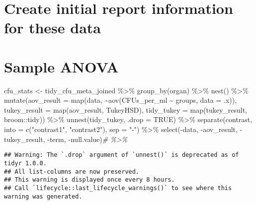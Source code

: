 \documentclass[
]{book}
\newenvironment{Shaded}{\begin{snugshade}}{\end{snugshade}}
\newcommand{\AttributeTok}[1]{\textcolor[rgb]{0.77,0.63,0.00}{#1}}
\newcommand{\CommentTok}[1]{\textcolor[rgb]{0.56,0.35,0.01}{\textit{#1}}}
\newcommand{\ConstantTok}[1]{\textcolor[rgb]{0.00,0.00,0.00}{#1}}
\newcommand{\FunctionTok}[1]{\textcolor[rgb]{0.00,0.00,0.00}{#1}}
\newcommand{\NormalTok}[1]{#1}
\newcommand{\OtherTok}[1]{\textcolor[rgb]{0.56,0.35,0.01}{#1}}
\newcommand{\SpecialCharTok}[1]{\textcolor[rgb]{0.00,0.00,0.00}{#1}}
\newcommand{\StringTok}[1]{\textcolor[rgb]{0.31,0.60,0.02}{#1}}
\begin{document}
\hypertarget{create-initial-report-information-for-these-data}{%
\section{Create initial report information for these data}\label{create-initial-report-information-for-these-data}}

\hypertarget{sample-anova}{%
\section{Sample ANOVA}\label{sample-anova}}

\begin{Shaded}
\begin{Highlighting}[]
\NormalTok{cfu\_stats }\OtherTok{\textless{}{-}}\NormalTok{ tidy\_cfu\_meta\_joined }\SpecialCharTok{\%\textgreater{}\%} 
  \FunctionTok{group\_by}\NormalTok{(organ) }\SpecialCharTok{\%\textgreater{}\%}
  \FunctionTok{nest}\NormalTok{() }\SpecialCharTok{\%\textgreater{}\%}
  \FunctionTok{mutate}\NormalTok{(}\AttributeTok{aov\_result =} \FunctionTok{map}\NormalTok{(data, }\SpecialCharTok{\textasciitilde{}}\FunctionTok{aov}\NormalTok{(CFUs\_per\_ml }\SpecialCharTok{\textasciitilde{}}\NormalTok{ groups, }\AttributeTok{data =}\NormalTok{ .x)),}
         \AttributeTok{tukey\_result =} \FunctionTok{map}\NormalTok{(aov\_result, TukeyHSD),}
         \AttributeTok{tidy\_tukey =} \FunctionTok{map}\NormalTok{(tukey\_result, broom}\SpecialCharTok{::}\NormalTok{tidy)) }\SpecialCharTok{\%\textgreater{}\%}
  \FunctionTok{unnest}\NormalTok{(tidy\_tukey, }\AttributeTok{.drop =} \ConstantTok{TRUE}\NormalTok{) }\SpecialCharTok{\%\textgreater{}\%}
  \FunctionTok{separate}\NormalTok{(contrast, }\AttributeTok{into =} \FunctionTok{c}\NormalTok{(}\StringTok{"contrast1"}\NormalTok{, }\StringTok{"contrast2"}\NormalTok{), }\AttributeTok{sep =} \StringTok{"{-}"}\NormalTok{) }\SpecialCharTok{\%\textgreater{}\%}
  \FunctionTok{select}\NormalTok{(}\SpecialCharTok{{-}}\NormalTok{data, }\SpecialCharTok{{-}}\NormalTok{aov\_result, }\SpecialCharTok{{-}}\NormalTok{tukey\_result, }\SpecialCharTok{{-}}\NormalTok{term, }\SpecialCharTok{{-}}\NormalTok{null.value)}\CommentTok{\# \%\textgreater{}\%}
\end{Highlighting}
\end{Shaded}

\begin{verbatim}
## Warning: The `.drop` argument of `unnest()` is deprecated as of tidyr 1.0.0.
## All list-columns are now preserved.
## This warning is displayed once every 8 hours.
## Call `lifecycle::last_lifecycle_warnings()` to see where this warning was generated.
\end{verbatim}
\end{document}
